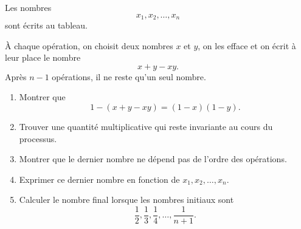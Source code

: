 Les nombres
\[
x_1, x_2, \ldots, x_n
\]
sont écrits au tableau.

À chaque opération, on choisit deux nombres $x$ et $y$, on les efface et on
écrit à leur place le nombre
\[
x + y - xy.
\]
Après $n - 1$ opérations, il ne reste qu'un seul nombre.
\begin{enumerate}
  \item Montrer que
  \[
  1 - (x + y - xy) = (1 - x)(1 - y).
  \]
  \item Trouver une quantité multiplicative qui reste invariante au cours du
  processus.
  \item Montrer que le dernier nombre ne dépend pas de l'ordre des opérations.
  \item Exprimer ce dernier nombre en fonction de $x_1, x_2, \ldots, x_n$.
  \item Calculer le nombre final lorsque les nombres initiaux sont
  \[
  \frac{1}{2}, \frac{1}{3}, \frac{1}{4}, \ldots, \frac{1}{n+1}.
  \]
\end{enumerate}
